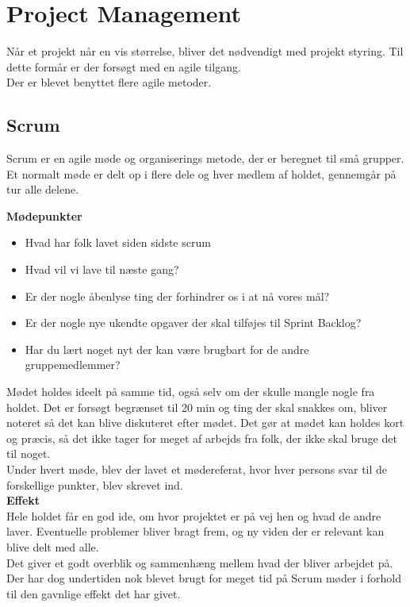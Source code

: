 \newpage
\section{Project Management}

Når et projekt når en vis størrelse, bliver det nødvendigt med projekt styring. Til dette formår er der forsøgt med en agile tilgang.\\

Der er blevet benyttet flere agile metoder.

\subsection{Scrum}

Scrum er en agile møde og organiserings metode, der er beregnet til små grupper. Et normalt møde er delt op i flere dele og hver medlem af holdet, gennemgår på tur alle delene.

\textbf{Mødepunkter}
\begin{itemize}
	\item Hvad har folk lavet siden sidste scrum
	\item Hvad vil vi lave til næste gang?
	\item Er der nogle åbenlyse ting der forhindrer os i at nå vores mål?
	\item Er der nogle nye ukendte opgaver der skal tilføjes til Sprint Backlog?
	\item Har du lært noget nyt der kan være brugbart for de andre gruppemedlemmer?
\end{itemize}

Mødet holdes ideelt på samme tid, også selv om der skulle mangle nogle fra holdet. Det er forsøgt begrænset til 20 min og ting der skal snakkes om, bliver noteret så det kan blive diskuteret efter mødet.
Det gør at mødet kan holdes kort og præcis, så det ikke tager for meget af arbejds fra folk, der ikke skal bruge det til noget.\\

Under hvert møde, blev der lavet et mødereferat, hvor hver persons svar til de forskellige punkter, blev skrevet ind.\\ %



\textbf{Effekt}\\

Hele holdet får en god ide, om hvor projektet er på vej hen og hvad de andre laver. Eventuelle problemer bliver bragt frem, og ny viden der er relevant kan blive delt med alle.\\
Det giver et godt overblik og sammenhæng mellem hvad der bliver arbejdet på. Der har dog undertiden nok blevet brugt for meget tid på Scrum møder i forhold til den gavnlige effekt det har givet.


